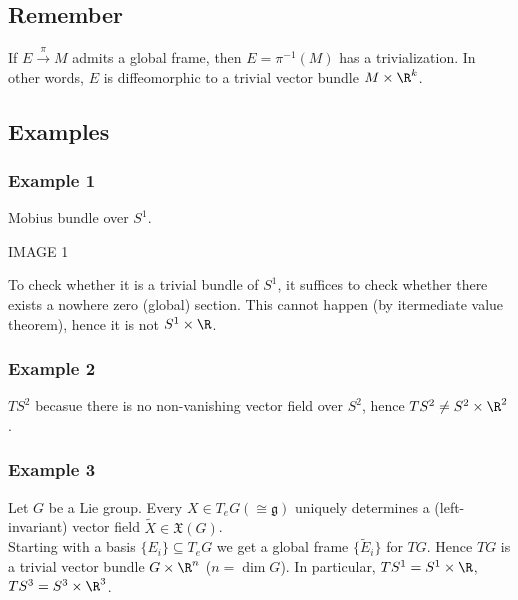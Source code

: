 \documentclass[11pt]{article}
\begin{document}
\subsection*{Remember}
\label{sec:org5622056}
If \(E\overset{\pi}{\to}M\) admits a global frame, then \(E=\pi^{-1}(M)\) has a trivialization. In other words, \(E\) is diffeomorphic to a trivial vector bundle \(M\times\R^{k}\).\\
\subsection*{Examples}
\label{sec:org4592930}
\subsubsection*{Example 1}
\label{sec:org7f5e004}
Mobius bundle over \(S^{1}\).\\
\begin{center}
IMAGE 1\\
\end{center}
To check whether it is a trivial bundle of \(S^{1}\), it suffices to check whether there exists a nowhere zero (global) section. This cannot happen (by itermediate value theorem), hence it is not \(S^{1}\times\R\).\\
\subsubsection*{Example 2}
\label{sec:org58bc66c}
\(TS^{2}\) becasue there is no non-vanishing vector field over \(S^{2}\), hence \(TS^{2}\neq S^{2}\times\R^{2}\).\\
\subsubsection*{Example 3}
\label{sec:org071476a}
Let \(G\) be a Lie group. Every \(X\in T_{e}G(\cong\mathfrak{g})\) uniquely determines a (left-invariant) vector field \(\tilde{X}\in\mathfrak{X}(G)\).\\
Starting with a basis \(\{E_{i}\}\subseteq T_{e}G\) we get a global frame \(\{\tilde{E}_{i}\}\) for \(TG\). Hence \(TG\) is a trivial vector bundle \(G\times\R^{n}\) (\(n=\dim G\)). In particular, \(TS^{1}=S^{1}\times\R\), \(TS^{3}=S^{3}\times\R^{3}\).\\
\end{document}
